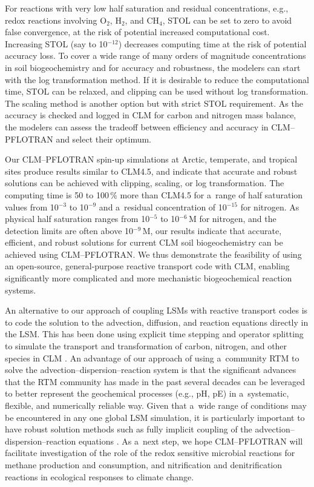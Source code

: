 \documentclass[gmd,noline]{copernicus}
\begin{document}
For reactions with very low half saturation and residual concentrations, e.g.,
redox reactions involving O$_2$, H$_2$, and CH$_4$, STOL
can be set to zero to avoid false convergence, at the risk of potential
increased computational cost. Increasing STOL (say to 10$^{-12}$) decreases
computing time at the risk of potential accuracy loss. To cover a wide range of
many orders of magnitude concentrations in soil biogeochemistry and for
accuracy and robustness, the modelers can start with the log transformation
method. If it is desirable to reduce the computational time, STOL can be
relaxed, and clipping can be used without log transformation. The scaling
method is another option but with strict STOL requirement. As the accuracy is
checked and logged in CLM for carbon and nitrogen mass balance, the modelers
can assess the tradeoff between efficiency and accuracy in CLM--PFLOTRAN and
select their optimum.

            Our CLM--PFLOTRAN spin-up simulations at Arctic, temperate, and
      tropical sites produce results similar to CLM4.5, and indicate that
      accurate and robust solutions can be achieved with clipping, scaling, or
      log transformation. The computing time is 50 to 100\,{\%} more than
      CLM4.5 for a~range of half saturation values from 10$^{-3}$ to
      10$^{-9}$ and a~residual concentration of 10$^{-15}$ for nitrogen. As
      physical half saturation ranges from 10$^{-5}$ to 10$^{-6}$\,\unit{M}
      for nitrogen, and the detection limits are often above
      10$^{-9}$\,\unit{M}, our results indicate that accurate, efficient,
      and robust solutions for current CLM soil biogeochemistry can be
      achieved using CLM--PFLOTRAN.  We thus demonstrate the feasibility of
      using an open-source, general-purpose reactive transport code with
      CLM, enabling significantly more complicated and more mechanistic
      biogeochemical reaction systems.

      An alternative to our approach of coupling LSMs with reactive
      transport codes is to code the solution to the advection, diffusion,
      and reaction equations directly in the LSM. This has been done using
      explicit time stepping and operator splitting to simulate the
      transport and transformation of carbon, nitrogen, and other species in
      CLM \citep{Tang2013b}. An advantage of our approach of using
      a~community RTM to solve the advection--dispersion--reaction system is
      that the significant advances that the RTM community has made in the
      past several decades can be leveraged to better represent the
      geochemical processes (e.g., pH, pE) in a~systematic, flexible, and
      numerically reliable way. Given that a~wide range of conditions may be
      encountered in any one global LSM simulation, it is particularly
      important to have robust solution methods such as fully implicit
      coupling of the advection--dispersion--reaction equations \citep{Yeh1989,Zheng2002,Steefel2015}.  As a~next
      step, we hope CLM--PFLOTRAN will facilitate investigation of the role
      of the redox sensitive microbial reactions for methane production and
      consumption, and nitrification and denitrification reactions in
      ecological responses to climate change.
\end{document}
